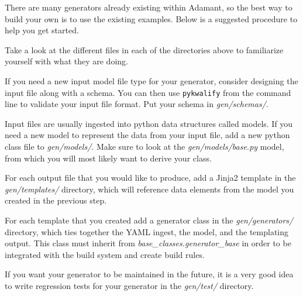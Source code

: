 There are many generators already existing within Adamant, so the best way to build your own is to use the existing examples. Below is a suggested procedure to help you get started.

\vspace{5mm} %
\begin{spacedenumerate}
  \item Take a look at the different files in each of the directories above to familiarize yourself with what they are doing.
  \item If you need a new input model file type for your generator, consider designing the input file along with a schema. You can then use \texttt{pykwalify} from the command line to validate your input file format. Put your schema in \textit{gen/schemas/}.
  \item Input files are usually ingested into python data structures called models. If you need a new model to represent the data from your input file, add a new python class file to \textit{gen/models/}. Make sure to look at the \textit{gen/models/base.py} model, from which you will most likely want to derive your class.
  \item For each output file that you would like to produce, add a Jinja2 template in the \textit{gen/templates/} directory, which will reference data elements from the model you created in the previous step.
  \item For each template that you created add a generator class in the \textit{gen/generators/} directory, which ties together the YAML ingest, the model, and the templating output. This class must inherit from \textit{base\_classes.generator\_base} in order to be integrated with the build system and create build rules.
  \item If you want your generator to be maintained in the future, it is a very good idea to write regression tests for your generator in the \textit{gen/test/} directory.
\end{spacedenumerate}
\vspace{5mm} %


